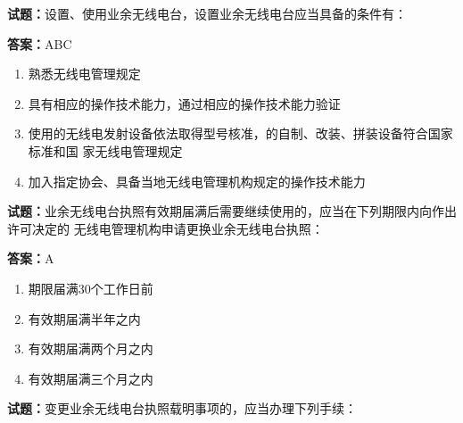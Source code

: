 \documentclass{ctexbook}
\begin{document}




\vspace{1em}

\textbf{试题：}设置、使用业余无线电台，设置业余无线电台应当具备的条件有： 

\textbf{答案：}ABC 

\begin{enumerate}[leftmargin=3em]
  \item 熟悉无线电管理规定 

  \item 具有相应的操作技术能力，通过相应的操作技术能力验证 

  \item 使用的无线电发射设备依法取得型号核准，的自制、改装、拼装设备符合国家标准和国
家无线电管理规定 

  \item 加入指定协会、具备当地无线电管理机构规定的操作技术能力 

\end{enumerate}





\vspace{1em}

\textbf{试题：}业余无线电台执照有效期届满后需要继续使用的，应当在下列期限内向作出许可决定的
无线电管理机构申请更换业余无线电台执照： 

\textbf{答案：}A 

\begin{enumerate}[leftmargin=3em]
  \item 期限届满30个工作日前 

  \item 有效期届满半年之内 

  \item 有效期届满两个月之内 

  \item 有效期届满三个月之内 

\end{enumerate}





\vspace{1em}

\textbf{试题：}变更业余无线电台执照载明事项的，应当办理下列手续： 
\end{document}
